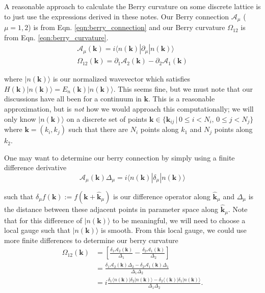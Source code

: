 \documentclass[12pt]{revtex4-2}
\begin{document}
A reasonable approach to calculate the Berry curvature on some discrete lattice is to just use the expressions derived in these notes.  Our Berry connection $\mathcal{A}_\mu$ ($\mu=1,2$) is from Eqn. \ref{eqn:berry_connection} and our Berry curvature $\Omega_{12}$ is from Eqn. \ref{eqn:berry_curvature}.
\begin{gather}
    \mathcal{A}_\mu(\mathbf{k}) = i\langle n(\mathbf{k}) | \partial_\mu | n(\mathbf{k})\rangle \\
    \Omega_{12}(\mathbf{k}) = \partial_1\mathcal{A}_2(\mathbf{k}) - \partial_2\mathcal{A}_1(\mathbf{k})
\end{gather}

where $|n(\mathbf{k})\rangle$ is our normalized wavevector which satisfies $H(\mathbf{k})|n(\mathbf{k})\rangle = E_n(\mathbf{k})|n(\mathbf{k})\rangle$.  This seems fine, but we must note that our discussions have all been for a continuum in $\mathbf{k}$.  This is a reasonable approximation, but is \emph{not} how we would approach this computationally; we will only know $|n(\mathbf{k})\rangle$ on a discrete set of points $\mathbf{k} \in \{\mathbf{k}_{ij} \, | \, 0 \leq i < N_i, \, 0 \leq j < N_j\}$ where $\mathbf{k} = (k_i,k_j)$ such that there are $N_i$ points along $k_1$ and $N_j$ points along $k_2$.  \par

One may want to determine our berry connection by simply using a finite difference derivative 
\begin{equation}
    \mathcal{A}_\mu(\mathbf{k}) \Delta_\mu = i\langle n(\mathbf{k}) | \delta_\mu | n(\mathbf{k}) \rangle
\end{equation}

such that $\delta_\mu f(\mathbf{k}) := f(\mathbf{k} + \hat{\mathbf{k}}_\mu)$ is our difference operator along $\hat{\mathbf{k}}_\mu$ and $\Delta_\mu$ is the distance between these adjacent points in parameter space along $\hat{\mathbf{k}}_\mu$.  Note that for this difference of $|n(\mathbf{k})\rangle$ to be meaningful, we will need to choose a local gauge such that $|n(\mathbf{k})\rangle$ is smooth.  From this local gauge, we could use more finite differences to determine our berry curvature 
\begin{align}
    \Omega_{12}(\mathbf{k}) &= \left[ \frac{\delta_1 \mathcal{A}_2(\mathbf{k})}{\Delta_1} - \frac{\delta_2 \mathcal{A}_1(\mathbf{k})}{\Delta_2} \right] \\
    &= \frac{\delta_1 \mathcal{A}_2(\mathbf{k})\Delta_2 - \delta_2 \mathcal{A}_1(\mathbf{k})\Delta_1}{\Delta_1\Delta_2} \\
    &= i\frac{\delta_1 \langle n(\mathbf{k})|\delta_2|n(\mathbf{k})\rangle - \delta_2 \langle(\mathbf{k})|\delta_1|n(\mathbf{k})\rangle}{\Delta_1\Delta_2}.
\end{align}
\end{document}
